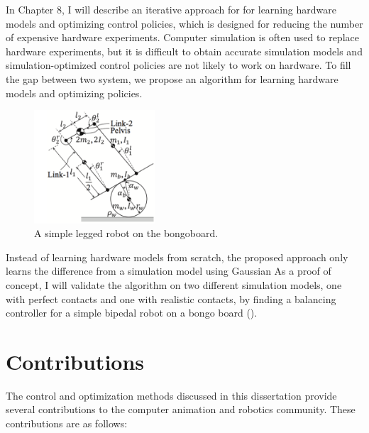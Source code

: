 In Chapter 8, I will describe an iterative approach for for learning 
hardware models and optimizing control policies, which is designed for
reducing the number of expensive hardware experiments.
Computer simulation is often used to replace hardware experiments,
but it is difficult to obtain accurate simulation models and
simulation-optimized control policies are not likely to work on hardware.
To fill the gap between two system, we propose an algorithm for learning
hardware models and optimizing policies. 
\begin{figure}
 \vspace{-10pt}
  \begin{center}
    \includegraphics[width=0.40\textwidth]{images/intro_simple_robot.png}
  \end{center}
   \vspace{-25pt}
  \caption{A simple legged robot on the bongoboard.}
  \label{fig:intro_bongo}
   \vspace{-10pt}
\end{figure}
Instead of learning hardware models from scratch, the proposed approach only
learns the difference from a simulation model using Gaussian 
As a proof of concept, I will validate the algorithm on two different 
simulation models, one with perfect contacts and one with realistic contacts,
by finding a balancing controller for a simple bipedal robot on a bongo board
().

\section{Contributions}
The control and optimization methods discussed in this dissertation provide
several contributions to the computer animation and robotics community. 
These contributions are as follows:

